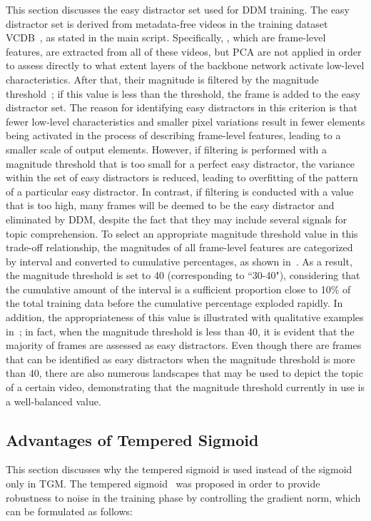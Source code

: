 \documentclass[10pt,twocolumn,letterpaper]{article}
\begin{document}
        This section discusses the easy distractor set used for DDM training. The easy distractor set is derived from metadata-free videos in the training dataset VCDB~\cite{jiang2014vcdb}, as stated in the main script. Specifically, , which are frame-level features, are extracted from all of these videos, but PCA are not applied in order to assess directly to what extent layers of the backbone network activate low-level characteristics. After that, their magnitude is filtered by the magnitude threshold~; if this value is less than the threshold, the frame is added to the easy distractor set. The reason for identifying easy distractors in this criterion is that fewer low-level characteristics and smaller pixel variations result in fewer elements being activated in the process of describing frame-level features, leading to a smaller scale of output elements. However, if filtering is performed with a magnitude threshold that is too small for a perfect easy distractor, the variance within the set of easy distractors is reduced, leading to overfitting of the pattern of a particular easy distractor. In contrast, if filtering is conducted with a value that is too high, many frames will be deemed to be the easy distractor and eliminated by DDM, despite the fact that they may include several signals for topic comprehension. To select an appropriate magnitude threshold value in this trade-off relationship, the magnitudes of all frame-level features are categorized by interval and converted to cumulative percentages, as shown in~. As a result, the magnitude threshold is set to 40 (corresponding to ``30-40"), considering that the cumulative amount of the interval is a sufficient proportion close to 10\% of the total training data before the cumulative percentage exploded rapidly. In addition, the appropriateness of this value is illustrated with qualitative examples in~; in fact, when the magnitude threshold is less than 40, it is evident that the majority of frames are assessed as easy distractors. Even though there are frames that can be identified as easy distractors when the magnitude threshold is more than 40, there are also numerous landscapes that may be used to depict the topic of a certain video, demonstrating that the magnitude threshold currently in use is a well-balanced value.
    
        
    
    
    \subsection{Advantages of Tempered Sigmoid} \label{tempered_exp}
        This section discusses why the tempered sigmoid is used instead of the sigmoid only in TGM. The tempered sigmoid~\cite{papernot2021tempered} was proposed in order to provide robustness to noise in the training phase by controlling the gradient norm, which can be formulated as follows:
        
\end{document}
